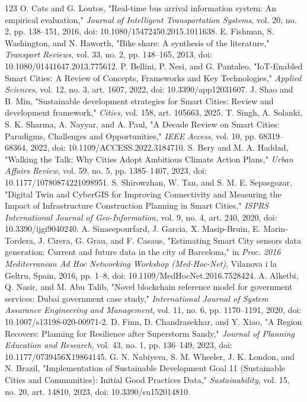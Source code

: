 \documentclass[journal]{IEEEtran}
\begin{document}
\begin{thebibliography}{123}
 O. Cats and G. Loutos, "Real-time bus arrival information system: An empirical evaluation," \emph{Journal of Intelligent Transportation Systems}, vol. 20, no. 2, pp. 138--151, 2016, doi: 10.1080/15472450.2015.1011638.
 E. Fishman, S. Washington, and N. Haworth, "Bike share: A synthesis of the literature," \emph{Transport Reviews}, vol. 33, no. 2, pp. 148--165, 2013, doi: 10.1080/01441647.2013.775612.
 P. Bellini, P. Nesi, and G. Pantaleo, "IoT-Enabled Smart Cities: A Review of Concepts, Frameworks and Key Technologies," \emph{Applied Sciences}, vol. 12, no. 3, art. 1607, 2022, doi: 10.3390/app12031607.
 J. Shao and B. Min, "Sustainable development strategies for Smart Cities: Review and development framework," \emph{Cities}, vol. 158, art. 105663, 2025.
 T. Singh, A. Solanki, S. K. Sharma, A. Nayyar, and A. Paul, "A Decade Review on Smart Cities: Paradigms, Challenges and Opportunities," \emph{IEEE Access}, vol. 10, pp. 68319--68364, 2022, doi: 10.1109/ACCESS.2022.3184710.
 S. Bery and M. A. Haddad, "Walking the Talk: Why Cities Adopt Ambitious Climate Action Plans," \emph{Urban Affairs Review}, vol. 59, no. 5, pp. 1385--1407, 2023, doi: 10.1177/10780874221098951.
 S. Shirowzhan, W. Tan, and S. M. E. Sepasgozar, "Digital Twin and CyberGIS for Improving Connectivity and Measuring the Impact of Infrastructure Construction Planning in Smart Cities," \emph{ISPRS International Journal of Geo-Information}, vol. 9, no. 4, art. 240, 2020, doi: 10.3390/ijgi9040240.
 A. Sinaeepourfard, J. Garcia, X. Masip-Bruin, E. Marin-Tordera, J. Cirera, G. Grau, and F. Casaus, "Estimating Smart City sensors data generation: Current and future data in the city of Barcelona," in \emph{Proc. 2016 Mediterranean Ad Hoc Networking Workshop (Med-Hoc-Net)}, Vilanova i la Geltru, Spain, 2016, pp. 1--8, doi: 10.1109/MedHocNet.2016.7528424.
 A. Alketbi, Q. Nasir, and M. Abu Talib, "Novel blockchain reference model for government services: Dubai government case study," \emph{International Journal of System Assurance Engineering and Management}, vol. 11, no. 6, pp. 1170--1191, 2020, doi: 10.1007/s13198-020-00971-2.
 D. Finn, D. Chandrasekhar, and Y. Xiao, "A Region Recovers: Planning for Resilience after Superstorm Sandy," \emph{Journal of Planning Education and Research}, vol. 43, no. 1, pp. 136--149, 2023, doi: 10.1177/0739456X19864145.
 G. N. Nabiyeva, S. M. Wheeler, J. K. London, and N. Brazil, "Implementation of Sustainable Development Goal 11 (Sustainable Cities and Communities): Initial Good Practices Data," \emph{Sustainability}, vol. 15, no. 20, art. 14810, 2023, doi: 10.3390/su152014810.

\end{thebibliography}
\end{document}
